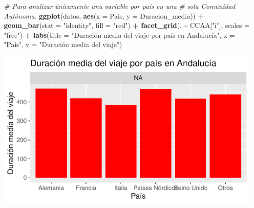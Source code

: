 \documentclass[data,article,submit,moreauthors,pdftex]{Definitions/mdpi}
\newenvironment{Shaded}{\begin{snugshade}}{\end{snugshade}}
\newcommand{\AttributeTok}[1]{\textcolor[rgb]{0.13,0.29,0.53}{#1}}
\newcommand{\CommentTok}[1]{\textcolor[rgb]{0.56,0.35,0.01}{\textit{#1}}}
\newcommand{\FunctionTok}[1]{\textcolor[rgb]{0.13,0.29,0.53}{\textbf{#1}}}
\newcommand{\NormalTok}[1]{#1}
\newcommand{\SpecialCharTok}[1]{\textcolor[rgb]{0.81,0.36,0.00}{\textbf{#1}}}
\newcommand{\StringTok}[1]{\textcolor[rgb]{0.31,0.60,0.02}{#1}}
\begin{document}
\begin{Shaded}
\begin{Highlighting}[]
\CommentTok{\# Para analizar únicamente una variable por país en una}
\CommentTok{\# sola Comunidad Autónoma.}
\FunctionTok{ggplot}\NormalTok{(datos, }\FunctionTok{aes}\NormalTok{(}\AttributeTok{x =}\NormalTok{ Pais, }\AttributeTok{y =}\NormalTok{ Duracion\_media)) }\SpecialCharTok{+} \FunctionTok{geom\_bar}\NormalTok{(}\AttributeTok{stat =} \StringTok{"identity"}\NormalTok{,}
    \AttributeTok{fill =} \StringTok{"red"}\NormalTok{) }\SpecialCharTok{+} \FunctionTok{facet\_grid}\NormalTok{(. }\SpecialCharTok{\textasciitilde{}}\NormalTok{ CCAA[}\StringTok{"i"}\NormalTok{], }\AttributeTok{scales =} \StringTok{"free"}\NormalTok{) }\SpecialCharTok{+}
    \FunctionTok{labs}\NormalTok{(}\AttributeTok{title =} \StringTok{"Duración media del viaje por país en Andalucía"}\NormalTok{,}
        \AttributeTok{x =} \StringTok{"País"}\NormalTok{, }\AttributeTok{y =} \StringTok{"Duración media del viaje"}\NormalTok{)}
\end{Highlighting}
\end{Shaded}

\includegraphics{ProyectoAED2024_Rmd_files/figure-latex/unnamed-chunk-22-3.pdf}
\end{document}
